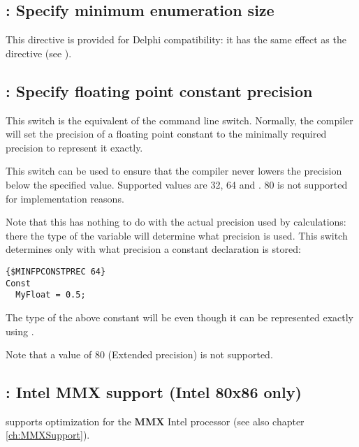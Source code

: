 \subsection{ : Specify minimum enumeration size}

This directive is provided for Delphi compatibility: it has the same effect
as the  directive (see ).

\subsection{ : Specify floating point constant precision}
\label{se:Minfpconstprec}

This switch is the equivalent of the  command line switch. 
Normally, the compiler will set the precision of a floating point constant to the minimally 
required precision to represent it exactly. 

This switch can be used to ensure that the compiler never lowers the precision below the specified value.
Supported values are 32, 64 and .  80 is not supported for implementation reasons.

Note that this has nothing to do with the actual precision used by
calculations: there the type of the variable will determine what precision
is used. This switch determines only with what precision a constant 
declaration is stored:
\begin{verbatim}
{$MINFPCONSTPREC 64}
Const
  MyFloat = 0.5;
\end{verbatim}
The type of the above constant will be  even though it can be represented exactly using .

Note that a value of 80 (Extended precision) is not supported.

\subsection{ : Intel MMX support (Intel 80x86 only)}

\fpc supports optimization for the \textbf{MMX} Intel
processor (see also chapter \ref{ch:MMXSupport}).

